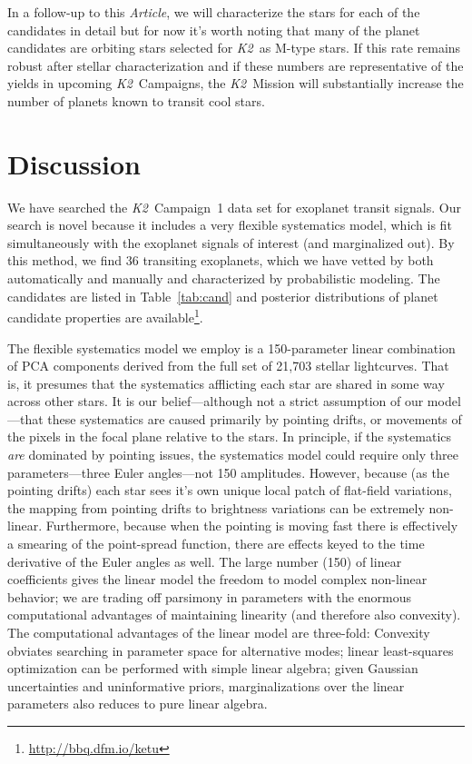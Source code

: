 \documentclass[12pt,preprint]{aastex}
\newcommand{\project}[1]{\textsl{#1}} %
\newcommand{\KT}{\project{K2}}
\newcommand{\paper}{\textsl{Article}}
\newcommand{\Tab}[1]{Table~\ref{tab:#1}}
\newcommand{\tab}[1]{\Tab{#1}}
\newcommand{\datareleaseurl}{{\url{http://bbq.dfm.io/ketu}}}
\begin{document}
In a follow-up to this \paper, we will characterize the stars for each of the
candidates in detail but for now it's worth noting that many of the planet
candidates are orbiting stars selected for \KT\ as M-type stars.
If this rate remains robust after stellar characterization and if these
numbers are representative of the yields in upcoming \KT\ Campaigns, the \KT\
Mission will substantially increase the number of planets known to transit
cool stars.


\section{Discussion}

We have searched the \KT\ Campaign~1 data set for exoplanet transit signals.
Our search is novel because it includes a very flexible systematics model,
which is fit simultaneously with the exoplanet signals of interest (and
marginalized out).
By this method, we find 36 transiting exoplanets, which we have vetted by both
automatically and manually and characterized by probabilistic modeling.
The candidates are listed in \tab{cand} and posterior distributions of planet
candidate properties are available\footnote{\datareleaseurl}.

The flexible systematics model we employ is a 150-parameter linear combination
of PCA components derived from the full set of 21,703 stellar lightcurves.
That is, it presumes that the systematics afflicting each star are shared in
some way across other stars.
It is our belief---although not a strict assumption of our model---that these
systematics are caused primarily by pointing drifts, or movements of the
pixels in the focal plane relative to the stars.
In principle, if the systematics \emph{are} dominated by pointing issues, the
systematics model could require only three parameters---three Euler
angles---not 150 amplitudes.
However, because (as the pointing drifts) each star sees it's own unique
local patch of flat-field variations, the mapping from pointing drifts to
brightness variations can be extremely non-linear.
Furthermore, because when the pointing is moving fast there is effectively
a smearing of the point-spread function, there are effects keyed to the
time derivative of the Euler angles as well.
The large number (150) of linear coefficients gives the linear model the
freedom to model complex non-linear behavior; we are trading off parsimony
in parameters with the enormous computational advantages of maintaining
linearity (and therefore also convexity).
The computational advantages of the linear model are three-fold:
Convexity obviates searching in parameter space for alternative modes;
linear least-squares optimization can be performed with simple linear algebra;
given Gaussian uncertainties and uninformative priors, marginalizations over
the linear parameters also reduces to pure linear algebra.
\end{document}
